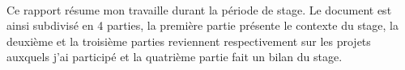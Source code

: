 \paragraph{}
Ce rapport résume mon travaille durant la période de stage. Le document est ainsi subdivisé en 4 parties, la première partie présente le contexte du stage, la deuxième et la troisième parties reviennent respectivement sur les projets auxquels j’ai participé et la quatrième partie fait un bilan du stage.


